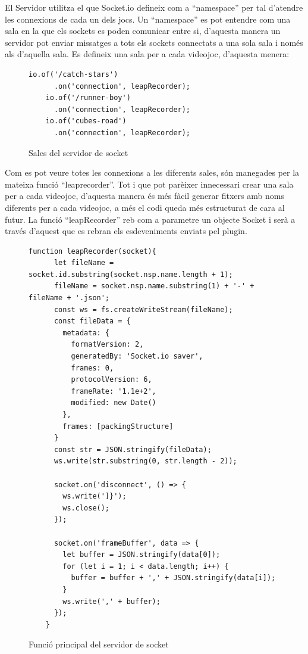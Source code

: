 \documentclass[12pt,a4paper,catalan]{article}
\begin{document}
	El Servidor utilitza el que Socket.io defineix com a “namespace” per tal d'atendre les connexions de cada un dels jocs. Un “namespace” es pot entendre com una sala en la que els sockets es poden comunicar entre si, d'aquesta manera un servidor pot enviar missatges a tots els sockets connectats a una sola sala i només als d'aquella sala.
	Es defineix una sala per a cada videojoc, d'aquesta menera:
	\begin{figure}[H]
	\begin{lstlisting}[]
	io.of('/catch-stars')
	  .on('connection', leapRecorder);
	io.of('/runner-boy')
	  .on('connection', leapRecorder);
	io.of('cubes-road')
	  .on('connection', leapRecorder);
	\end{lstlisting}
		\caption{Sales del servidor de socket}
		\label{fig:socket-namespaces}
	\end{figure}
	Com es pot veure totes les connexions a les diferents sales, són manegades per la mateixa funció “leaprecorder”. Tot i que pot parèixer innecessari crear una sala per a cada videojoc, d'aquesta manera és més fàcil generar fitxers amb noms diferents per a cada videojoc, a més el codi queda més estructurat de cara al futur.
	La funció “leapRecorder” reb com a parametre un objecte Socket i serà a través d'aquest que es rebran els esdeveniments enviats pel plugin.
	\begin{figure}[H]
	\begin{lstlisting}[]
	function leapRecorder(socket){
	  let fileName = socket.id.substring(socket.nsp.name.length + 1);
	  fileName = socket.nsp.name.substring(1) + '-' + fileName + '.json';
	  const ws = fs.createWriteStream(fileName);
	  const fileData = {
	    metadata: {
	      formatVersion: 2,
	      generatedBy: 'Socket.io saver',
	      frames: 0,
	      protocolVersion: 6,
	      frameRate: '1.1e+2',
	      modified: new Date()
	    },
	    frames: [packingStructure]
	  }
	  const str = JSON.stringify(fileData);
	  ws.write(str.substring(0, str.length - 2));
	
	  socket.on('disconnect', () => {
	    ws.write(']}');
	    ws.close();
	  });
	
	  socket.on('frameBuffer', data => {
	    let buffer = JSON.stringify(data[0]);
	    for (let i = 1; i < data.length; i++) {
	      buffer = buffer + ',' + JSON.stringify(data[i]);
	    }
	    ws.write(',' + buffer);
	  });
	}
	\end{lstlisting}
		\caption{Funció principal del servidor de socket}
		\label{fig:socket-namespaces}
	\end{figure}
\end{document}
